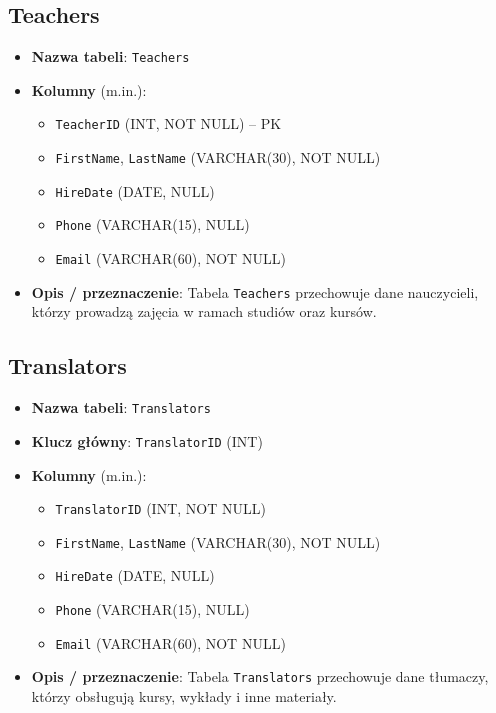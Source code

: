 \documentclass[12pt]{article}
\begin{document}
\subsection{Teachers}
\begin{itemize}
    \item \textbf{Nazwa tabeli}: \texttt{Teachers}
    \item \textbf{Kolumny} (m.in.):
          \begin{itemize}
            \item \texttt{TeacherID} (INT, NOT NULL) -- PK
            \item \texttt{FirstName}, \texttt{LastName} (VARCHAR(30), NOT NULL)
            \item \texttt{HireDate} (DATE, NULL)
            \item \texttt{Phone} (VARCHAR(15), NULL)
            \item \texttt{Email} (VARCHAR(60), NOT NULL)
          \end{itemize}
    \item \textbf{Opis / przeznaczenie}:  
          Tabela \texttt{Teachers} przechowuje dane nauczycieli, którzy prowadzą zajęcia w ramach studiów oraz kursów.
\end{itemize}

\subsection{Translators}
\begin{itemize}
    \item \textbf{Nazwa tabeli}: \texttt{Translators}
    \item \textbf{Klucz główny}: \texttt{TranslatorID} (INT)
    \item \textbf{Kolumny} (m.in.):
          \begin{itemize}
            \item \texttt{TranslatorID} (INT, NOT NULL)
            \item \texttt{FirstName}, \texttt{LastName} (VARCHAR(30), NOT NULL)
            \item \texttt{HireDate} (DATE, NULL)
            \item \texttt{Phone} (VARCHAR(15), NULL)
            \item \texttt{Email} (VARCHAR(60), NOT NULL)
          \end{itemize}
    \item \textbf{Opis / przeznaczenie}:  
          Tabela \texttt{Translators} przechowuje dane tłumaczy, którzy obsługują kursy, wykłady i inne materiały.
\end{itemize}
\end{document}
